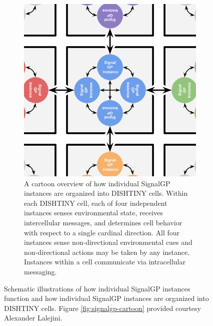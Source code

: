 \begin{figure}
\begin{center}
\hspace*{\fill}%
\begin{minipage}[t]{\columnwidth}
\centering
\vspace{0pt} %
\begin{subfigure}[b]{\textwidth}
\includegraphics[width=\textwidth]{img/dishtinygp-cartoon}
\caption{
A cartoon overview of how individual SignalGP instances are organized into DISHTINY cells.
Within each DISHTINY cell, each of four independent instances senses environmental state, receives intercellular messages, and determines cell behavior with respect to a single cardinal direction.
All four instances sense non-directional environmental cues and non-directional actions may be taken by any instance.
Instances within a cell communicate via intracellular messaging.
}
\label{fig:dishtinygp-cartoon}
\end{subfigure}
\end{minipage}%
\hspace*{\fill}


\caption{
Schematic illustrations of how individual SignalGP instances function and how individual SignalGP instances are organized into DISHTINY cells.
Figure \ref{fig:signalgp-cartoon} provided courtesy Alexander Lalejini.
}
\label{fig:signalgp-dishtinygp}
\end{center}
\end{figure}
